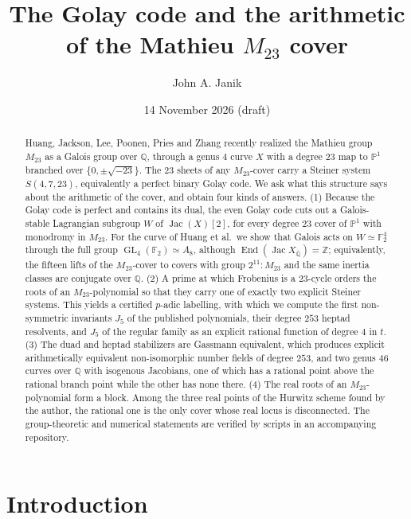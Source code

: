 \documentclass[11pt]{amsart}
\title[The Golay code and the arithmetic of the $M_{23}$ cover]{The Golay code and the arithmetic\\ of the Mathieu $M_{23}$ cover}
\author{John A. Janik}
\date{14 November 2026 (draft)}
\theoremstyle{definition}
\newcommand{\QQ}{\mathbb{Q}}
\newcommand{\ZZ}{\mathbb{Z}}
\newcommand{\FF}{\mathbb{F}}
\newcommand{\PP}{\mathbb{P}}
\newcommand{\Qbar}{\overline{\QQ}}
\newcommand{\End}{\operatorname{End}}
\newcommand{\Jac}{\operatorname{Jac}}
\newcommand{\GL}{\operatorname{GL}}
\newcommand{\M}{M_{23}}
\begin{document}
\begin{abstract}
Huang, Jackson, Lee, Poonen, Pries and Zhang recently realized the Mathieu group $\M$ as a Galois group over $\QQ$, through a genus $4$ curve $X$ with a degree $23$ map to $\PP^1$ branched over $\{0,\pm\sqrt{-23}\}$. The $23$ sheets of any $\M$-cover carry a Steiner system $S(4,7,23)$, equivalently a perfect binary Golay code. We ask what this structure says about the arithmetic of the cover, and obtain four kinds of answers.
(1) Because the Golay code is perfect and contains its dual, the even Golay code cuts out a Galois-stable Lagrangian subgroup $W$ of $\Jac(X)[2]$, for every degree $23$ cover of $\PP^1$ with monodromy in $\M$. For the curve of Huang et al.\ we show that Galois acts on $W\simeq\FF_2^4$ through the full group $\GL_4(\FF_2)\simeq A_8$, although $\End(\Jac X_{\Qbar})=\ZZ$; equivalently, the fifteen lifts of the $\M$-cover to covers with group $2^{11}{:}\M$ and the same inertia classes are conjugate over $\QQ$.
(2) A prime at which Frobenius is a $23$-cycle orders the roots of an $\M$-polynomial so that they carry one of exactly two explicit Steiner systems. This yields a certified $p$-adic labelling, with which we compute the first non-symmetric invariants $J_5$ of the published polynomials, their degree $253$ heptad resolvents, and $J_5$ of the regular family as an explicit rational function of degree $4$ in $t$.
(3) The duad and heptad stabilizers are Gassmann equivalent, which produces explicit arithmetically equivalent non-isomorphic number fields of degree $253$, and two genus $46$ curves over $\QQ$ with isogenous Jacobians, one of which has a rational point above the rational branch point while the other has none there.
(4) The real roots of an $\M$-polynomial form a block. Among the three real points of the Hurwitz scheme found by the author, the rational one is the only cover whose real locus is disconnected.
The group-theoretic and numerical statements are verified by scripts in an accompanying repository.
\end{abstract}

\maketitle
\setcounter{tocdepth}{1}
\tableofcontents

\section{Introduction}
\end{document}
